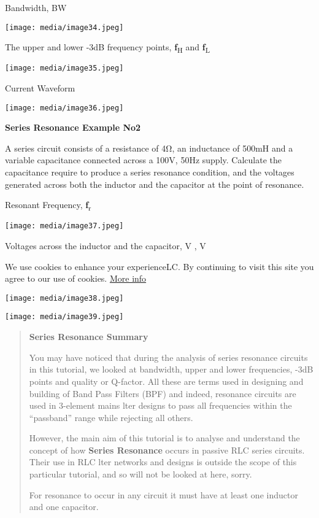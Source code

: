 \documentclass[]{article}
\begin{document}
Bandwidth, BW

\texttt{[image: media/image34.jpeg]}

The upper and lower -3dB frequency points, \textbf{ƒ}\textsubscript{H}
and \textbf{ƒ}\textsubscript{L}

\texttt{[image: media/image35.jpeg]}

Current Waveform

\texttt{[image: media/image36.jpeg]}

\textbf{Series Resonance Example No2}

A series circuit consists of a resistance of 4Ω, an inductance of 500mH
and a variable capacitance connected across a 100V, 50Hz supply.
Calculate the capacitance require to produce a series resonance
condition, and the voltages generated across both the inductor and the
capacitor at the point of resonance.

Resonant Frequency, \textbf{ƒ}\textsubscript{r}

\texttt{[image: media/image37.jpeg]}

Voltages across the inductor and the capacitor, V , V

We use cookies to enhance your experienceLC. By continuing to visit this
site you agree to our use of cookies.
\href{http://wikipedia.org/wiki/HTTP_cookie}{More info}

\texttt{[image: media/image38.jpeg]}

\texttt{[image: media/image39.jpeg]}

\begin{quote}
\textbf{Series Resonance Summary}

You may have noticed that during the analysis of series resonance
circuits in this tutorial, we looked at bandwidth, upper and lower
frequencies, -3dB points and quality or Q-factor. All these are terms
used in designing and building of Band Pass Filters (BPF) and indeed,
resonance circuits are used in 3-element mains lter designs to pass all
frequencies within the ``passband'' range while rejecting all others.

However, the main aim of this tutorial is to analyse and understand the
concept of how \textbf{Series Resonance} occurs in passive RLC series
circuits. Their use in RLC lter networks and designs is outside the
scope of this particular tutorial, and so will not be looked at here,
sorry.

For resonance to occur in any circuit it must have at least one inductor
and one capacitor.
\end{quote}
\end{document}
